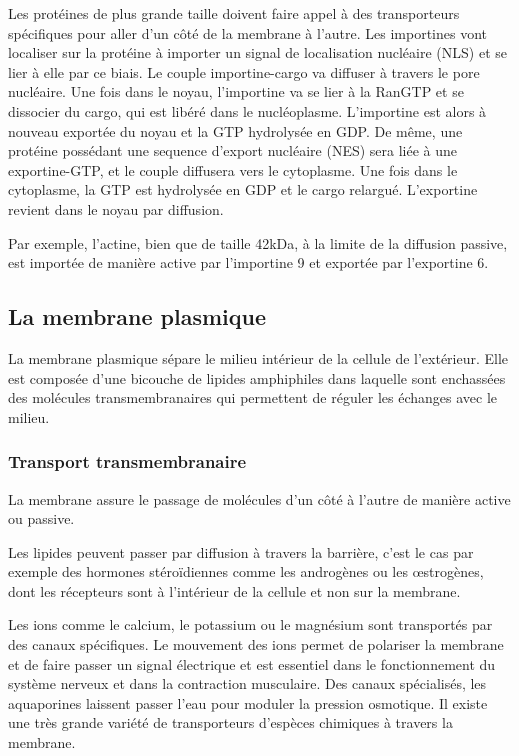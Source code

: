 \documentclass{report}
\begin{document}
Les protéines de plus grande taille doivent faire appel à des transporteurs spécifiques pour aller d'un côté de la membrane à l'autre. 
Les importines vont localiser sur la protéine à importer un signal de localisation nucléaire (NLS) et se lier à elle par ce biais. Le couple importine-cargo va diffuser à travers le pore nucléaire. Une fois dans le noyau, l'importine va se lier à la RanGTP et se dissocier du cargo, qui est libéré dans le nucléoplasme. L'importine est alors à nouveau exportée du noyau et la GTP hydrolysée en GDP. 
De même, une protéine possédant une sequence d'export nucléaire (NES) sera liée à une exportine-GTP, et le couple diffusera vers le cytoplasme. Une fois dans le cytoplasme, la GTP est hydrolysée en GDP et le cargo relargué. L'exportine revient dans le noyau par diffusion. 

Par exemple, l'actine, bien que de taille 42kDa, à la limite de la diffusion passive, est importée de manière active par l'importine 9 et exportée par l'exportine 6. 

\subsection{La membrane plasmique}

La membrane plasmique sépare le milieu intérieur de la cellule de l'extérieur. Elle est composée d'une bicouche de lipides amphiphiles dans laquelle sont enchassées des molécules transmembranaires qui permettent de réguler les échanges avec le milieu. 

\subsubsection{Transport transmembranaire}
La membrane assure le passage de molécules d'un côté à l'autre de manière active ou passive. 

Les lipides peuvent passer par diffusion à travers la barrière, c'est le cas par exemple des hormones stéroïdiennes comme les androgènes ou les \oe strogènes, dont les récepteurs sont à l'intérieur de la cellule et non sur la membrane.

Les ions comme le calcium, le potassium ou le magnésium sont transportés par des canaux spécifiques. Le mouvement des ions permet de polariser la membrane et de faire passer un signal électrique et est essentiel dans le fonctionnement du système nerveux et dans la contraction musculaire. Des canaux spécialisés, les aquaporines laissent passer l'eau pour moduler la pression osmotique. Il existe une très grande variété de transporteurs d'espèces chimiques à travers la membrane. 
\end{document}
